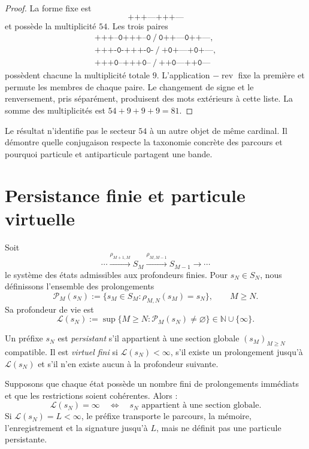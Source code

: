 \begin{proof}
La forme fixe est
\[
\texttt{+++---+++---}
\]
et possède la multiplicité \(54\). Les trois paires
\[
\begin{array}{c}
\texttt{+++--0+++--0}\ /\ \texttt{0++---0++---},\\
\texttt{+++-0-+++-0-}\ /\ \texttt{+0+---+0+---},\\
\texttt{+++0--+++0--}\ /\ \texttt{++0---++0---}
\end{array}
\]
possèdent chacune la multiplicité totale \(9\). L’application \(-\operatorname{rev}\) fixe la première et permute les membres de chaque paire. Le changement de signe et le renversement, pris séparément, produisent des mots extérieurs à cette liste. La somme des multiplicités est \(54+9+9+9=81\).
\end{proof}

Le résultat n’identifie pas le secteur \(54\) à un autre objet de même cardinal. Il démontre quelle conjugaison respecte la taxonomie concrète des parcours et pourquoi particule et antiparticule partagent une bande.

\section{Persistance finie et particule virtuelle}

Soit
\[
\cdots\xrightarrow{\rho_{M+1,M}}S_M
\xrightarrow{\rho_{M,M-1}}S_{M-1}\xrightarrow{}\cdots
\]
le système des états admissibles aux profondeurs finies. Pour \(s_N\in S_N\), nous définissons l’ensemble des prolongements
\[
\mathcal P_M(s_N)
:=
\{s_M\in S_M:\rho_{M,N}(s_M)=s_N\},
\qquad M\geq N.
\]
Sa profondeur de vie est
\[
\mathcal L(s_N)
:=\sup\{M\geq N:\mathcal P_M(s_N)\neq\varnothing\}
\in\mathbb N\cup\{\infty\}.
\]

\begin{definition}
\label{def:persistencia-virtualidad} Un préfixe \(s_N\) est \emph{persistant} s’il appartient à une section globale \((s_M)_{M\geq N}\) compatible. Il est \emph{virtuel fini} si \(\mathcal L(s_N)<\infty\), s’il existe un prolongement jusqu’à \(\mathcal L(s_N)\) et s’il n’en existe aucun à la profondeur suivante.
\end{definition}

\begin{theorem}
\label{thm:criterio-persistencia-virtual} Supposons que chaque état possède un nombre fini de prolongements immédiats et que les restrictions soient cohérentes. Alors :
\[
\mathcal L(s_N)=\infty
\quad\Longleftrightarrow\quad
s_N\text{ appartient à une section globale}.
\]
Si \(\mathcal L(s_N)=L<\infty\), le préfixe transporte le parcours, la mémoire, l’enregistrement et la signature jusqu’à \(L\), mais ne définit pas une particule persistante.
\end{theorem}

